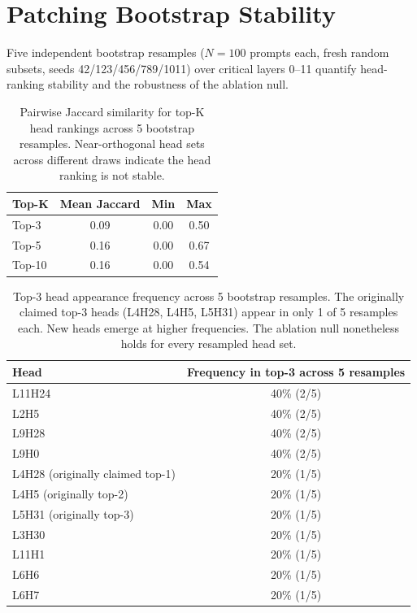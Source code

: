 \documentclass{article}
\begin{document}
\FloatBarrier
\section{Patching Bootstrap Stability}
\label{app:bootstrap}

Five independent bootstrap resamples ($N{=}100$ prompts each, fresh random subsets, seeds 42/123/456/789/1011) over critical layers 0--11 quantify head-ranking stability and the robustness of the ablation null.

\begin{table}[!ht]
\centering
\small
\caption{Pairwise Jaccard similarity for top-K head rankings across 5 bootstrap resamples. Near-orthogonal head sets across different draws indicate the head ranking is not stable.}
\label{tab:jaccard}
\begin{tabular}{@{}lccc@{}}
\toprule
\textbf{Top-K} & \textbf{Mean Jaccard} & \textbf{Min} & \textbf{Max} \\
\midrule
Top-3 & 0.09 & 0.00 & 0.50 \\
Top-5 & 0.16 & 0.00 & 0.67 \\
Top-10 & 0.16 & 0.00 & 0.54 \\
\bottomrule
\end{tabular}
\end{table}

\begin{table}[!ht]
\centering
\small
\caption{Top-3 head appearance frequency across 5 bootstrap resamples. The originally claimed top-3 heads (L4H28, L4H5, L5H31) appear in only 1 of 5 resamples each. New heads emerge at higher frequencies. The ablation null nonetheless holds for every resampled head set.}
\label{tab:head_frequency}
\begin{tabular}{@{}lc@{}}
\toprule
\textbf{Head} & \textbf{Frequency in top-3 across 5 resamples} \\
\midrule
L11H24 & 40\% (2/5) \\
L2H5 & 40\% (2/5) \\
L9H28 & 40\% (2/5) \\
L9H0 & 40\% (2/5) \\
L4H28 (originally claimed top-1) & 20\% (1/5) \\
L4H5 (originally top-2) & 20\% (1/5) \\
L5H31 (originally top-3) & 20\% (1/5) \\
L3H30 & 20\% (1/5) \\
L11H1 & 20\% (1/5) \\
L6H6 & 20\% (1/5) \\
L6H7 & 20\% (1/5) \\
\bottomrule
\end{tabular}
\end{table}
\end{document}
